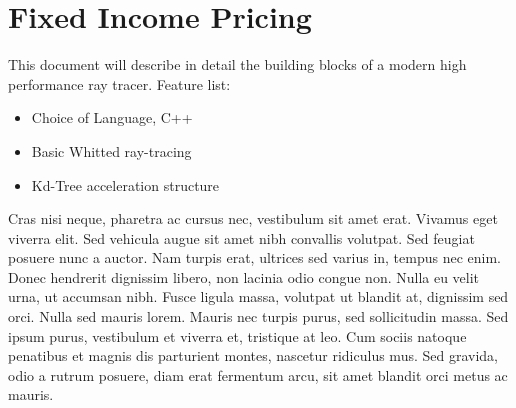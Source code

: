 \chapter{Fixed Income Pricing}
This document will describe in detail the building blocks of a modern high performance ray tracer.
Feature list:
\begin{itemize}
\item Choice of Language, C++
\item Basic Whitted ray-tracing
\item Kd-Tree acceleration structure
\end{itemize}
Cras nisi neque, pharetra ac cursus nec, vestibulum sit amet erat. Vivamus eget viverra elit. Sed vehicula augue sit amet nibh convallis volutpat. Sed feugiat posuere nunc a auctor. Nam turpis erat, ultrices sed varius in, tempus nec enim. Donec hendrerit dignissim libero, non lacinia odio congue non. Nulla eu velit urna, ut accumsan nibh. Fusce ligula massa, volutpat ut blandit at, dignissim sed orci. Nulla sed mauris lorem. Mauris nec turpis purus, sed sollicitudin massa. Sed ipsum purus, vestibulum et viverra et, tristique at leo. Cum sociis natoque penatibus et magnis dis parturient montes, nascetur ridiculus mus. Sed gravida, odio a rutrum posuere, diam erat fermentum arcu, sit amet blandit orci metus ac mauris.
